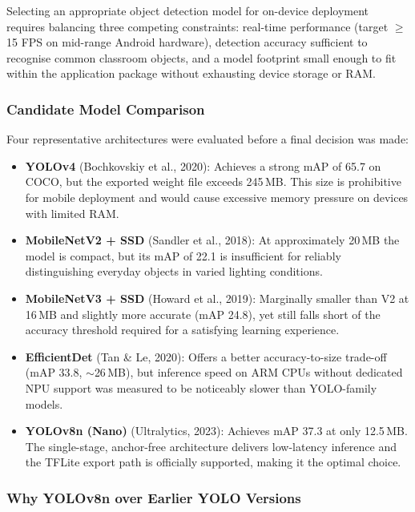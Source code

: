 \documentclass[a4paper, 12pt]{article}
\begin{document}
    Selecting an appropriate object detection model for on-device deployment requires balancing three competing constraints: real-time performance (target $\geq$15 FPS on mid-range Android hardware), detection accuracy sufficient to recognise common classroom objects, and a model footprint small enough to fit within the application package without exhausting device storage or RAM.

    \subsubsection{Candidate Model Comparison}

    Four representative architectures were evaluated before a final decision was made:

    \begin{itemize}
        \item \textbf{YOLOv4} (Bochkovskiy et al., 2020): Achieves a strong mAP of 65.7 on COCO, but the exported weight file exceeds 245\,MB. This size is prohibitive for mobile deployment and would cause excessive memory pressure on devices with limited RAM.
        \item \textbf{MobileNetV2 + SSD} (Sandler et al., 2018): At approximately 20\,MB the model is compact, but its mAP of 22.1 is insufficient for reliably distinguishing everyday objects in varied lighting conditions.
        \item \textbf{MobileNetV3 + SSD} (Howard et al., 2019): Marginally smaller than V2 at 16\,MB and slightly more accurate (mAP 24.8), yet still falls short of the accuracy threshold required for a satisfying learning experience.
        \item \textbf{EfficientDet} (Tan \& Le, 2020): Offers a better accuracy-to-size trade-off (mAP 33.8, $\sim$26\,MB), but inference speed on ARM CPUs without dedicated NPU support was measured to be noticeably slower than YOLO-family models.
        \item \textbf{YOLOv8n (Nano)} (Ultralytics, 2023): Achieves mAP 37.3 at only 12.5\,MB. The single-stage, anchor-free architecture delivers low-latency inference and the TFLite export path is officially supported, making it the optimal choice.
    \end{itemize}

    \subsubsection{Why YOLOv8n over Earlier YOLO Versions}
\end{document}
